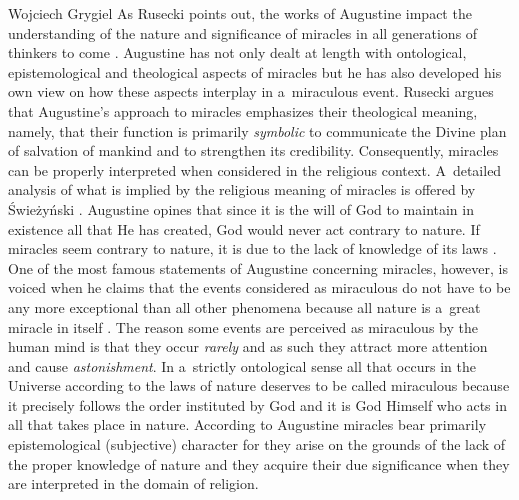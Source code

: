 \begin{artengenv}{Wojciech Grygiel}
As Rusecki points out, the works of Augustine impact the understanding of the nature and significance of miracles in all generations of thinkers to come
\parencite[][pp.35–36]{rusecki_traktat_2006}. %
 Augustine has not only dealt at length with ontological, epistemological and theological aspects of miracles but he has also developed his own view on how these aspects interplay in a~miraculous event. Rusecki argues that Augustine’s approach to miracles emphasizes their theological meaning, namely, that their function is primarily \textit{symbolic} to communicate the Divine plan of salvation of mankind and to strengthen its credibility. Consequently, miracles can be properly interpreted when considered in the religious context. A~detailed analysis of what is implied by the religious meaning of miracles is offered by Świeżyński 
\parencite*[][pp.225–273]{swiezynski_filozofia_2012}. %
 Augustine opines that since it is the will of God to maintain in existence all that He has created, God would never act contrary to nature. If miracles seem contrary to nature, it is due to the lack of knowledge of its laws 
\parencite[][\textit{The City of God}, XXI.8]{augustine_city_2003}. %
 One of the most famous statements of Augustine concerning miracles, however, is voiced when he claims that the events considered as miraculous do not have to be any more exceptional than all other phenomena because all nature is a~great miracle in itself 
\parencite[][\textit{The City of God}, X.12; X.16-18; XXI.7; XXI.8]{augustine_city_2003}. %
 The reason some events are perceived as miraculous by the human mind is that they occur \textit{rarely} and as such they attract more attention and cause \textit{astonishment}. In a~strictly ontological sense all that occurs in the Universe according to the laws of nature deserves to be called miraculous because it precisely follows the order instituted by God and it is God Himself who acts in all that takes place in nature. According to Augustine miracles bear primarily epistemological (subjective) character for they arise on the grounds of the lack of the proper knowledge of nature and they acquire their due significance when they are interpreted in the domain of religion.


\end{artengenv}

